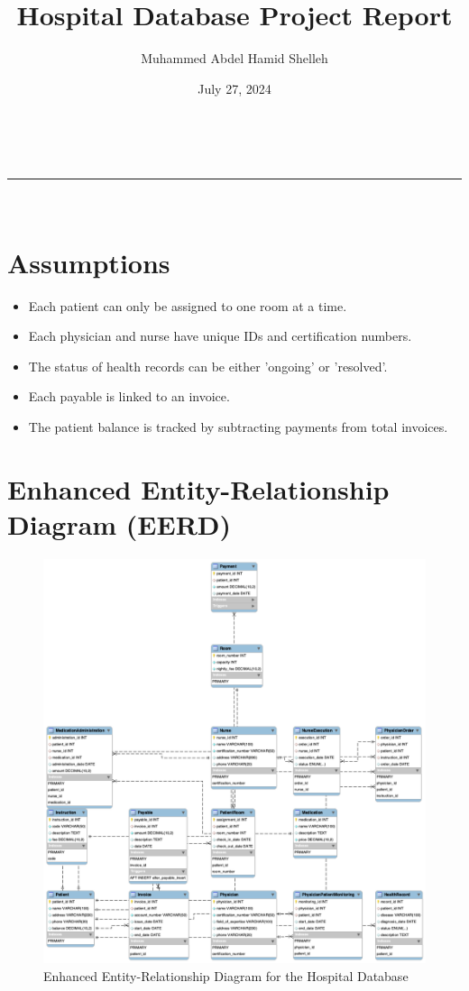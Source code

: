 \documentclass[a4paper,11pt]{article}
\title{Hospital Database Project Report}
\author{Muhammed Abdel Hamid Shelleh}
\date{July 27, 2024}
\makeatletter
\newcommand{\linia}{\rule{\linewidth}{0.5pt}}
\theoremstyle{mytheor}
\renewcommand{\maketitle}{
\begin{center}
\vspace{2ex}
{\huge \textsc{\@title}}
\vspace{1ex}
\\
\linia\\
\@author \hfill \@date
\vspace{4ex}
\end{center}
}
\makeatother
\begin{document}
\maketitle

\section{Assumptions}
\begin{itemize}
    \item Each patient can only be assigned to one room at a time.
    \item Each physician and nurse have unique IDs and certification numbers.
    \item The status of health records can be either 'ongoing' or 'resolved'.
    \item Each payable is linked to an invoice.
    \item The patient balance is tracked by subtracting payments from total invoices.
\end{itemize}

\section{Enhanced Entity-Relationship Diagram (EERD)}
\begin{figure}[H]
    \centering
    \includegraphics[width=1\textwidth]{hospital.png}
    \caption{Enhanced Entity-Relationship Diagram for the Hospital Database}
\end{figure}
\end{document}
